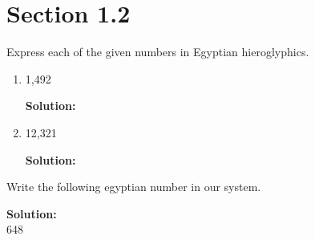 \documentclass[12pt]{article}
\makeatletter
\theoremstyle{homework}
\newenvironment{exercise}[1]
{\def\@currentlabel{#1}\exercisecore}
{\endexercisecore}
\newcommand{\localhead}[1]{\par\smallskip\noindent\textbf{#1}\nobreak\\}%
\newcommand\solution{\localhead{Solution:}}
\makeatother
\begin{document}
\section*{Section 1.2}

\begin{exercise}{1} Express each of the given numbers in Egyptian hieroglyphics.\\
    \begin{enumerate}
        \item 1,492 
        \solution
        
        \cartouche{\pmglyph{\Hthousand \Hhundred \Hhundred \Hhundred \Hhundred \Hten \Hten \Hten \Hten \Hten \Hten \Hten \Hten
        \Hten \Hone \Hone}}

        \item 12,321
        \solution
        
        \cartouche{ \pmglyph{\HXthousand \Hthousand \Hthousand \Hhundred \Hhundred \Hhundred \Hten \Hten \Hone}}

    \end{enumerate}
\end{exercise}


\begin{exercise}{2} Write the following egyptian number in our system.\\

    \cartouche{ \pmglyph{\Hone-\Hone-\Hone-\Hone-\Hone-\Hone-\Hone-\Hone-\Hten-\Hten-\Hten-\Hten-\Hhundred-\Hhundred-\Hhundred-\Hhundred-\Hhundred-\Hhundred}}
    \solution

    648
\end{exercise}
\end{document}
